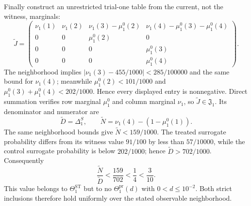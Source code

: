 Finally construct an unrestricted trial-one table from the current, not the witness, marginals:
\[
 \widetilde J=
 \begin{pmatrix}
 \nu_1(1)&\nu_1(2)&\nu_1(3)-\mu_1^0(2)&\nu_1(4)-\mu_1^0(3)-\mu_1^0(4)\\
 0&0&\mu_1^0(2)&0\\
 0&0&0&\mu_1^0(3)\\
 0&0&0&\mu_1^0(4)
 \end{pmatrix}.
\]
The neighborhood implies \(|\nu_1(3)-455/1000|<285/100000\) and the same bound for \(\nu_1(4)\); meanwhile \(\mu_1^0(2)<101/1000\) and \(\mu_1^0(3)+\mu_1^0(4)<202/1000\).  Hence every displayed entry is nonnegative.  Direct summation verifies row marginal \(\mu_1^0\) and column marginal \(\nu_1\), so \(\widetilde J\in\mathfrak J_1\).  Its denominator and numerator are
\[
 \widetilde D=\Delta_1^S,
 \qquad
 \widetilde N=\nu_1(4)-(1-\mu_1^0(1)).
\]
The same neighborhood bounds give \(\widetilde N<159/1000\).  The treated surrogate probability differs from its witness value \(91/100\) by less than \(57/10000\), while the control surrogate probability is below \(202/1000\); hence \(\widetilde D>702/1000\).  Consequently
\[
 \frac{\widetilde N}{\widetilde D}<\frac{159}{702}<\frac14<\frac3{10}.
\]
This value belongs to \(\Theta_1^{\mathrm{ST}}\) but to no \(\Theta_1^{\mathrm{pr}}(d)\) with \(0<d\le10^{-2}\).  Both strict inclusions therefore hold uniformly over the stated observable neighborhood.